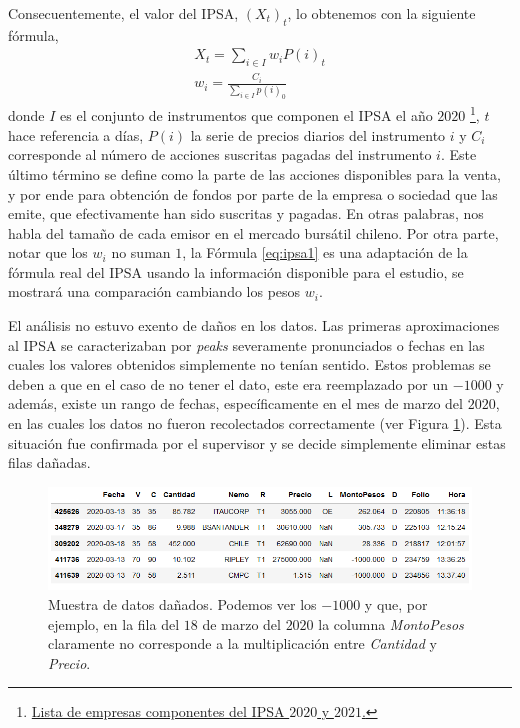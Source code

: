 \documentclass{article}
\begin{document}
   	Consecuentemente, el valor del IPSA, $(X_t)_t$, lo obtenemos con la siguiente fórmula,
   	\begin{align}
   		\label{eq:ipsa1}
		X_t = \sum_{i\in I} w_i P(i)_t\\
		\label{eq:ipsa2}
		w_i = \frac{C_i}{\sum_{i\in I} p(i)_0}
   	\end{align}
   donde $I$ es el conjunto de instrumentos que componen el IPSA el año $2020$ \footnote{\href{https://www.rankia.cl/blog/analisis-ipsa/3229498-que-empresas-forman-parte-ipsa-2021}{Lista de empresas componentes del IPSA $2020$ y $2021$.}}, $t$ hace referencia a días, $P(i)$ la serie de precios diarios del instrumento $i$ y $C_i$ corresponde al número de acciones suscritas pagadas del instrumento $i$. Este último término se define como la parte de las acciones disponibles para la venta, y por ende para obtención de fondos por parte de la empresa o sociedad que las emite, que efectivamente han sido suscritas y pagadas. En otras palabras, nos habla del tamaño de cada emisor en el mercado bursátil chileno.
   Por otra parte, notar que los  $w_i$ no suman $1$, la Fórmula \ref{eq:ipsa1} es una adaptación de la fórmula real del IPSA usando la información disponible para el estudio, se mostrará una comparación cambiando los pesos $w_i$.
   	\begin{remark}
   		El análisis no estuvo exento de daños en los datos. Las primeras aproximaciones al IPSA se caracterizaban por \textit{peaks} severamente pronunciados o fechas en las cuales los valores obtenidos simplemente no tenían sentido. Estos problemas se deben a que en el caso de no tener el dato, este era reemplazado por un $-1000$ y además, existe un rango de fechas, específicamente en el mes de marzo del $2020$, en las cuales los datos no fueron recolectados correctamente (ver Figura \ref{fig:danados}). Esta situación fue confirmada por el supervisor y se decide simplemente eliminar estas filas dañadas. 
   		
   		\begin{figure}[H]
   			\centering
   			\includegraphics[scale=.5]{imgs/muestra_danada.png}
   			\caption{Muestra de datos dañados. Podemos ver los $-1000$ y que, por ejemplo, en la fila del $18$ de marzo del $2020$ la columna \textit{MontoPesos} claramente no corresponde a la multiplicación entre \textit{Cantidad} y \textit{Precio}.}
   			\label{fig:danados}
   		\end{figure}
   		
   	\end{remark}
   	
\end{document}

